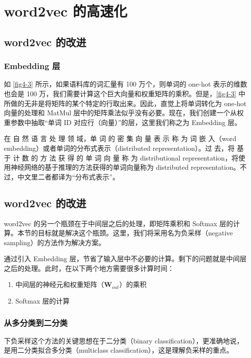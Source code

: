 \chapter{word2vec 的高速化\label{Ch04}}
\section{word2vec 的改进 }
\subsection{Embedding 层}
如 \autoref{fig4-3} 所示，如果语料库的词汇量有 100 万个，则单词的 one-hot 表示的维数也会是 100 万，我们需要计算这个巨大向量和权重矩阵的乘积。但是，\autoref{fig4-3} 中所做的无非是将矩阵的某个特定的行取出来。因此，直觉上将单词转化为 one-hot 向量的处理和 MatMul 层中的矩阵乘法似乎没有必要。现在，我们创建一个从权重参数中抽取“单词 ID 对应行（向量）”的层，这里我们称之为 Embedding 层。

\begin{tcolorbox}
    在 自 然 语 言 处 理 领 域，单 词 的 密 集 向 量 表 示 称 为 词 嵌 入（word embedding）或者单词的分布式表示（distributed representation）。过 去，将 基 于 计 数 的 方 法 获 得 的 单 词 向 量 称 为 distributional representation，将使用神经网络的基于推理的方法获得的单词向量称为 distributed representation。不过，中文里二者都译为“分布式表示”。
\end{tcolorbox}
\section{word2vec 的改进 }
word2vec 的另一个瓶颈在于中间层之后的处理，即矩阵乘积和 Softmax 层的计算。本节的目标就是解决这个瓶颈。这里，我们将采用名为负采样（negative sampling）的方法作为解决方案。

通过引入 Embedding 层，节省了输入层中不必要的计算。剩下的问题就是中间层之后的处理。此时，在以下两个地方需要很多计算时间：
\begin{enumerate}
    \item 中间层的神经元和权重矩阵（$\bm{W}_{out}$）的乘积
    \item Softmax 层的计算
\end{enumerate}
\subsection{从多分类到二分类}
下负采样这个方法的关键思想在于二分类（binary classification），更准确地说，是用二分类拟合多分类（multiclass classification），这是理解负采样的重点。
